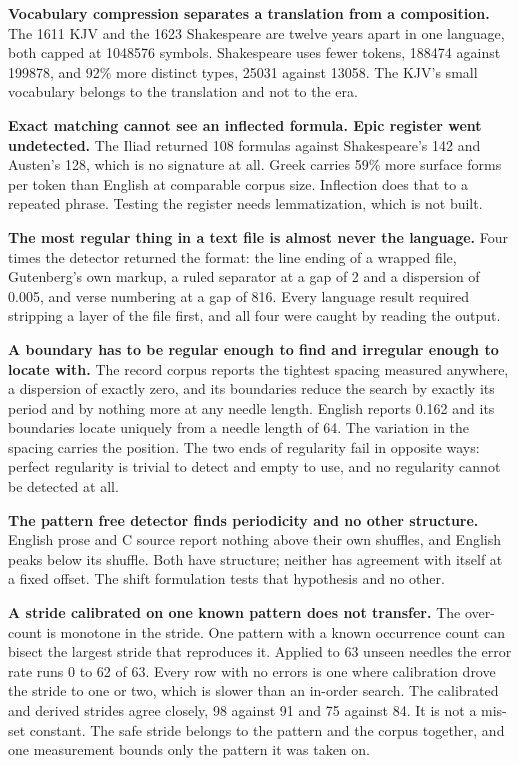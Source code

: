 \textbf{Vocabulary compression separates a translation from a composition.} The 1611 KJV and the 1623 Shakespeare are twelve years apart in one language, both capped at 1048576 symbols. Shakespeare uses fewer tokens, 188474 against 199878, and 92\% more distinct types, 25031 against 13058. The KJV's small vocabulary belongs to the translation and not to the era.

\textbf{Exact matching cannot see an inflected formula. Epic register went undetected.} The Iliad returned 108 formulas against Shakespeare's 142 and Austen's 128, which is no signature at all. Greek carries 59\% more surface forms per token than English at comparable corpus size. Inflection does that to a repeated phrase. Testing the register needs lemmatization, which is not built.

\textbf{The most regular thing in a text file is almost never the language.} Four times the detector returned the format: the line ending of a wrapped file, Gutenberg's own markup, a ruled separator at a gap of 2 and a dispersion of 0.005, and verse numbering at a gap of 816. Every language result required stripping a layer of the file first, and all four were caught by reading the output.

\textbf{A boundary has to be regular enough to find and irregular enough to locate with.} The record corpus reports the tightest spacing measured anywhere, a dispersion of exactly zero, and its boundaries reduce the search by exactly its period and by nothing more at any needle length. English reports 0.162 and its boundaries locate uniquely from a needle length of 64. The variation in the spacing carries the position. The two ends of regularity fail in opposite ways: perfect regularity is trivial to detect and empty to use, and no regularity cannot be detected at all.

\textbf{The pattern free detector finds periodicity and no other structure.} English prose and C source report nothing above their own shuffles, and English peaks below its shuffle. Both have structure; neither has agreement with itself at a fixed offset. The shift formulation tests that hypothesis and no other.

\textbf{A stride calibrated on one known pattern does not transfer.} The over-count is monotone in the stride. One pattern with a known occurrence count can bisect the largest stride that reproduces it. Applied to 63 unseen needles the error rate runs 0 to 62 of 63. Every row with no errors is one where calibration drove the stride to one or two, which is slower than an in-order search. The calibrated and derived strides agree closely, 98 against 91 and 75 against 84. It is not a mis-set constant. The safe stride belongs to the pattern and the corpus together, and one measurement bounds only the pattern it was taken on.


